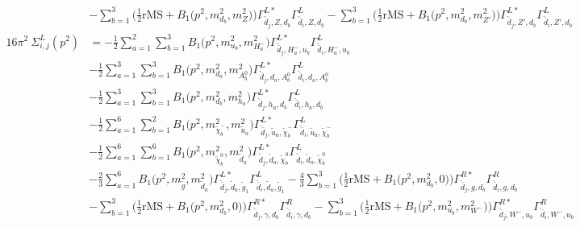 \begin{itemize}
\begin{align}
 &- \sum_{b=1}^{3}\Big(\frac{1}{2} \text{rMS}  + {B_1\Big(p^{2},m^2_{d_{{b}}},m^2_{Z}\Big)}\Big){\Gamma^{L*}_{\check{\bar{d}}_{{j}},Z,d_{{b}}}} {\Gamma^L_{\check{\bar{d}}_{{i}},Z,d_{{b}}}}  - \sum_{b=1}^{3}\Big(\frac{1}{2} \text{rMS}  + {B_1\Big(p^{2},m^2_{d_{{b}}},m^2_{{Z'}}\Big)}\Big){\Gamma^{L*}_{\check{\bar{d}}_{{j}},{Z'},d_{{b}}}} {\Gamma^L_{\check{\bar{d}}_{{i}},{Z'},d_{{b}}}}  \\ 
16\pi^2 \ \Sigma^L_{i,j}(p^2) &= -\frac{1}{2} \sum_{a=1}^{2}\sum_{b=1}^{3}{B_1\Big(p^{2},m^2_{u_{{b}}},m^2_{H^-_{{a}}}\Big)} {\Gamma^{L*}_{\check{\bar{d}}_{{j}},H^-_{{a}},u_{{b}}}} {\Gamma^L_{\check{\bar{d}}_{{i}},H^-_{{a}},u_{{b}}}}  \nonumber \\ 
 &-\frac{1}{2} \sum_{a=1}^{3}\sum_{b=1}^{3}{B_1\Big(p^{2},m^2_{d_{{a}}},m^2_{A^0_{{b}}}\Big)} {\Gamma^{L*}_{\check{\bar{d}}_{{j}},d_{{a}},A^0_{{b}}}} {\Gamma^L_{\check{\bar{d}}_{{i}},d_{{a}},A^0_{{b}}}}  \nonumber \\ 
 &-\frac{1}{2} \sum_{a=1}^{3}\sum_{b=1}^{3}{B_1\Big(p^{2},m^2_{d_{{b}}},m^2_{h_{{a}}}\Big)} {\Gamma^{L*}_{\check{\bar{d}}_{{j}},h_{{a}},d_{{b}}}} {\Gamma^L_{\check{\bar{d}}_{{i}},h_{{a}},d_{{b}}}}  \nonumber \\ 
 &-\frac{1}{2} \sum_{a=1}^{6}\sum_{b=1}^{2}{B_1\Big(p^{2},m^2_{\tilde{\chi}^-_{{b}}},m^2_{\tilde{u}_{{a}}}\Big)} {\Gamma^{L*}_{\check{\bar{d}}_{{j}},\tilde{u}_{{a}},\tilde{\chi}^-_{{b}}}} {\Gamma^L_{\check{\bar{d}}_{{i}},\tilde{u}_{{a}},\tilde{\chi}^-_{{b}}}}  \nonumber \\ 
 &-\frac{1}{2} \sum_{a=1}^{6}\sum_{b=1}^{6}{B_1\Big(p^{2},m^2_{\tilde{\chi}^0_{{b}}},m^2_{\tilde{d}_{{a}}}\Big)} {\Gamma^{L*}_{\check{\bar{d}}_{{j}},\tilde{d}_{{a}},\tilde{\chi}^0_{{b}}}} {\Gamma^L_{\check{\bar{d}}_{{i}},\tilde{d}_{{a}},\tilde{\chi}^0_{{b}}}}  \nonumber \\ 
 &-\frac{2}{3} \sum_{a=1}^{6}{B_1\Big(p^{2},m^2_{\tilde{g}},m^2_{\tilde{d}_{{a}}}\Big)} {\Gamma^{L*}_{\check{\bar{d}}_{{j}},\tilde{d}_{{a}},\tilde{g}_{{1}}}} {\Gamma^L_{\check{\bar{d}}_{{i}},\tilde{d}_{{a}},\tilde{g}_{{1}}}}  -\frac{4}{3} \sum_{b=1}^{3}\Big(\frac{1}{2} \text{rMS}  + {B_1\Big(p^{2},m^2_{d_{{b}}},0\Big)}\Big){\Gamma^{R*}_{\check{\bar{d}}_{{j}},g,d_{{b}}}} {\Gamma^R_{\check{\bar{d}}_{{i}},g,d_{{b}}}}  \nonumber \\ 
 &- \sum_{b=1}^{3}\Big(\frac{1}{2} \text{rMS}  + {B_1\Big(p^{2},m^2_{d_{{b}}},0\Big)}\Big){\Gamma^{R*}_{\check{\bar{d}}_{{j}},\gamma,d_{{b}}}} {\Gamma^R_{\check{\bar{d}}_{{i}},\gamma,d_{{b}}}}  - \sum_{b=1}^{3}\Big(\frac{1}{2} \text{rMS}  + {B_1\Big(p^{2},m^2_{u_{{b}}},m^2_{W^-}\Big)}\Big){\Gamma^{R*}_{\check{\bar{d}}_{{j}},W^-,u_{{b}}}} {\Gamma^R_{\check{\bar{d}}_{{i}},W^-,u_{{b}}}}  \nonumber \\ 

\end{align}
\end{itemize}
